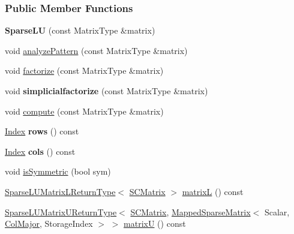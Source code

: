 \subsubsection*{Public Member Functions}
\begin{DoxyCompactItemize}
\item 
\mbox{\label{group___sparse_l_u___module_ac1678e57af46b42561cea4f149861164}} 
{\bfseries Sparse\+LU} (const Matrix\+Type \&matrix)
\item 
void \hyperlink{group___sparse_l_u___module_aa907ff958c4f4855145091d2686f3a8a}{analyze\+Pattern} (const Matrix\+Type \&matrix)
\item 
void \hyperlink{group___sparse_l_u___module_a39858b0e72f2659d596364e252b34cbc}{factorize} (const Matrix\+Type \&matrix)
\item 
\mbox{\label{group___sparse_l_u___module_a4841f300341aab4999881ce7f6e38b40}} 
void {\bfseries simplicialfactorize} (const Matrix\+Type \&matrix)
\item 
void \hyperlink{group___sparse_l_u___module_a96a8dcb02015ab9be5777d4ba9173266}{compute} (const Matrix\+Type \&matrix)
\item 
\mbox{\label{group___sparse_l_u___module_a5d4cc6663767bbed1efd278480ee2975}} 
\hyperlink{namespace_eigen_a62e77e0933482dafde8fe197d9a2cfde}{Index} {\bfseries rows} () const
\item 
\mbox{\label{group___sparse_l_u___module_a634e903f97c46b55591db2e12d1d45d1}} 
\hyperlink{namespace_eigen_a62e77e0933482dafde8fe197d9a2cfde}{Index} {\bfseries cols} () const
\item 
void \hyperlink{group___sparse_l_u___module_afff3bd506cd78172e5219c707562729f}{is\+Symmetric} (bool sym)
\item 
\hyperlink{struct_eigen_1_1_sparse_l_u_matrix_l_return_type}{Sparse\+L\+U\+Matrix\+L\+Return\+Type}$<$ \hyperlink{group___sparse_l_u___module}{S\+C\+Matrix} $>$ \hyperlink{group___sparse_l_u___module_a634abe55e5a076f2e10db78871105a8f}{matrixL} () const
\item 
\hyperlink{struct_eigen_1_1_sparse_l_u_matrix_u_return_type}{Sparse\+L\+U\+Matrix\+U\+Return\+Type}$<$ \hyperlink{group___sparse_l_u___module}{S\+C\+Matrix}, \hyperlink{class_eigen_1_1_mapped_sparse_matrix}{Mapped\+Sparse\+Matrix}$<$ Scalar, \hyperlink{group__enums_ggaacded1a18ae58b0f554751f6cdf9eb13a0cbd4bdd0abcfc0224c5fcb5e4f6669a}{Col\+Major}, Storage\+Index $>$ $>$ \hyperlink{group___sparse_l_u___module_aaf395a8fca527144215ff19cc7b8b637}{matrixU} () const

\end{DoxyCompactItemize}

